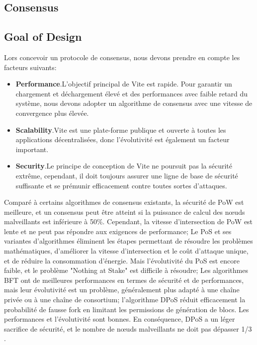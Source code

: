\documentclass[UTF8,nofonts]{article}
\begin{document}
\begin{multicols}{2}
\section{Consensus}
\subsection{Goal of Design}
Lors concevoir un protocole de consensus, nous devons prendre en compte les facteurs suivants:
\begin{itemize}
	\item \textbf{Performance}.L'objectif principal de Vite est rapide. Pour garantir un chargement et déchargement élevé et des performances avec faible retard du système, nous devons adopter un algorithme de consensus avec une vitesse de convergence plus élevée.
	\item \textbf{Scalability}.Vite est une plate-forme publique et ouverte à toutes les applications décentralisées, donc l'évolutivité est également un facteur important.
	\item \textbf{Security}.Le principe de conception de Vite ne poursuit pas la sécurité extrême, cependant, il doit toujours assurer une ligne de base de sécurité suffisante et se prémunir efficacement contre toutes sortes d'attaques.
\end{itemize}

Comparé à certains algorithmes de consensus existants, la sécurité de PoW est meilleure, et un consensus peut être atteint si la puissance de calcul des nœuds malveillants est inférieure à 50\%. Cependant, la vitesse d'intersection de PoW est lente et ne peut pas répondre aux exigences de performance; Le PoS et ses variantes d'algorithmes éliminent les étapes permettant de résoudre les problèmes mathématiques, d'améliorer la vitesse d'intersection et le coût d'attaque unique, et de réduire la consommation d'énergie. Mais l'évolutivité du PoS est encore faible, et le problème "Nothing at Stake" \cite{problems} est difficile à résoudre; Les algorithmes BFT ont de meilleures performances en termes de sécurité et de performances, mais leur évolutivité est un problème, généralement plus adapté à une chaîne privée ou à une chaîne de consortium; l'algorithme DPoS \cite{dpos} réduit efficacement la probabilité de fausse fork en limitant les permissions de génération de blocs. Les performances et l'évolutivité sont bonnes. En conséquence, DPoS a un léger sacrifice de sécurité, et le nombre de nœuds malveillants ne doit pas dépasser 1/3 \cite{dpos2}.


\end{multicols}
\end{document}
